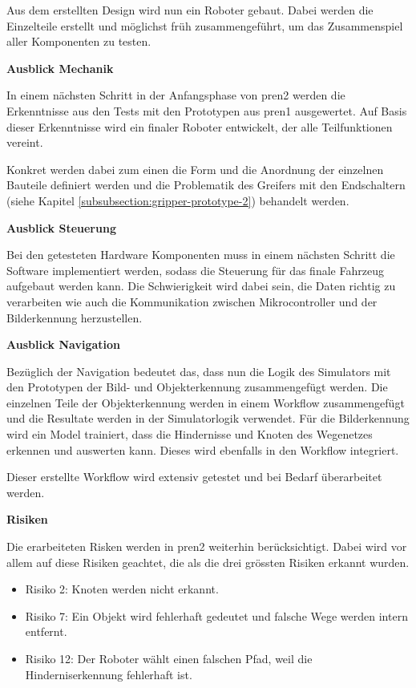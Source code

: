 Aus dem erstellten Design wird nun ein Roboter gebaut. Dabei werden die Einzelteile erstellt und möglichst früh zusammengeführt, um das Zusammenspiel aller Komponenten zu testen.

\textbf{Ausblick Mechanik}

In einem nächsten Schritt in der Anfangsphase von \acrshort{pren2} werden die Erkenntnisse aus den Tests mit den Prototypen aus \acrshort{pren1} ausgewertet. Auf Basis dieser Erkenntnisse wird ein finaler Roboter entwickelt, der alle Teilfunktionen vereint.   

Konkret werden dabei zum einen die Form und die Anordnung der einzelnen Bauteile definiert werden und die Problematik des Greifers mit den Endschaltern (siehe Kapitel \ref{subsubsection:gripper-prototype-2}) behandelt werden.

\textbf{Ausblick Steuerung}

Bei den getesteten Hardware Komponenten  muss in einem nächsten Schritt die Software implementiert werden, sodass die Steuerung für das finale Fahrzeug aufgebaut werden kann. Die Schwierigkeit wird dabei sein, die Daten richtig zu verarbeiten wie auch die Kommunikation zwischen Mikrocontroller und der Bilderkennung herzustellen.

\textbf{Ausblick Navigation}

Bezüglich der Navigation bedeutet das, dass nun die Logik des Simulators mit den Prototypen der Bild- und Objekterkennung zusammengefügt werden. Die einzelnen Teile der Objekterkennung werden in einem Workflow zusammengefügt und die Resultate werden in der Simulatorlogik verwendet. Für die Bilderkennung wird ein Model trainiert, dass die Hindernisse und Knoten des Wegenetzes erkennen und auswerten kann. Dieses wird ebenfalls in den Workflow integriert.

Dieser erstellte Workflow wird extensiv getestet und bei Bedarf überarbeitet werden.

\textbf{Risiken}

Die erarbeiteten Risken werden in \acrshort{pren2} weiterhin berücksichtigt. Dabei wird vor allem auf diese Risiken geachtet, die als die drei grössten Risiken erkannt wurden.

\begin{itemize}
    \item Risiko 2: Knoten werden nicht erkannt.
    \item Risiko 7: Ein Objekt wird fehlerhaft gedeutet und falsche Wege werden intern entfernt.
    \item Risiko 12: Der Roboter wählt einen falschen Pfad, weil die Hinderniserkennung fehlerhaft ist.
\end{itemize}

